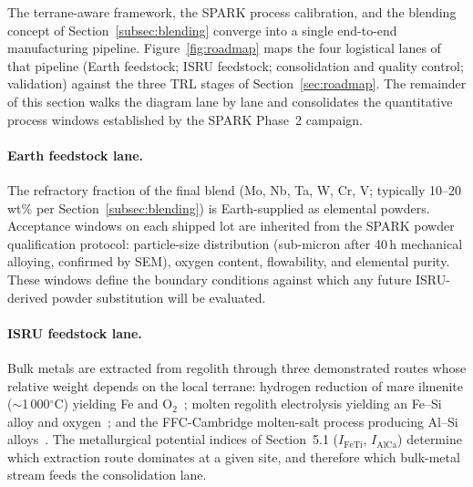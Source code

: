 \documentclass[11pt,a4paper]{article}
\begin{document}
The terrane-aware framework, the SPARK process calibration, and the blending concept of Section~\ref{subsec:blending} converge into a single end-to-end manufacturing pipeline. Figure~\ref{fig:roadmap} maps the four logistical lanes of that pipeline (Earth feedstock; ISRU feedstock; consolidation and quality control; validation) against the three TRL stages of Section~\ref{sec:roadmap}. The remainder of this section walks the diagram lane by lane and consolidates the quantitative process windows established by the SPARK Phase~2 campaign.

\paragraph{Earth feedstock lane.} The refractory fraction of the final blend (Mo, Nb, Ta, W, Cr, V; typically 10--20\,wt\% per Section~\ref{subsec:blending}) is Earth-supplied as elemental powders. Acceptance windows on each shipped lot are inherited from the SPARK powder qualification protocol: particle-size distribution (sub-micron after 40\,h mechanical alloying, confirmed by SEM), oxygen content, flowability, and elemental purity. These windows define the boundary conditions against which any future ISRU-derived powder substitution will be evaluated.

\paragraph{ISRU feedstock lane.} Bulk metals are extracted from regolith through three demonstrated routes whose relative weight depends on the local terrane: hydrogen reduction of mare ilmenite ($\sim$1\,000$^\circ$C) yielding Fe and O$_2$~\cite{Sanders2013, Anand2012}; molten regolith electrolysis yielding an Fe--Si alloy and oxygen~\cite{Sanders2025, Lomax2020}; and the FFC-Cambridge molten-salt process producing Al--Si alloys~\cite{Lomax2020}. The metallurgical potential indices of Section~5.1 ($I_\text{FeTi}$, $I_\text{AlCa}$) determine which extraction route dominates at a given site, and therefore which bulk-metal stream feeds the consolidation lane.
\end{document}
